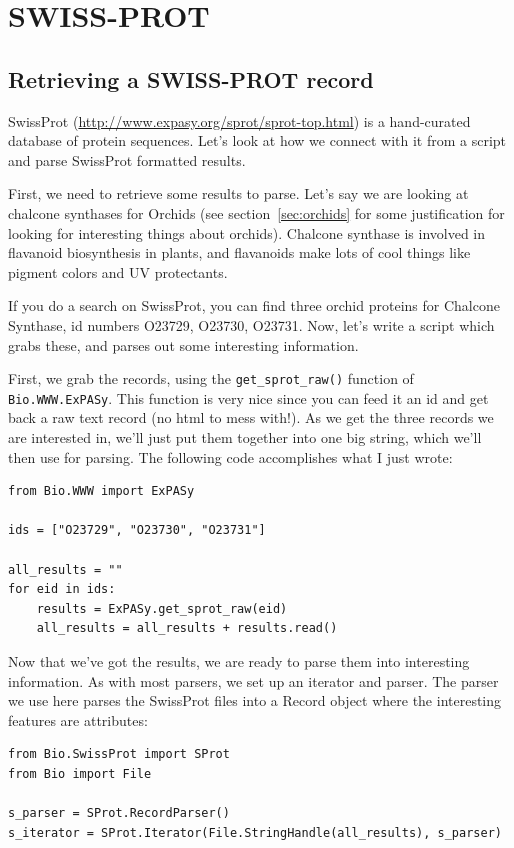 \documentclass{report}
\begin{document}
\section{SWISS-PROT}
\label{sec:swiss_prot}

\subsection{Retrieving a SWISS-PROT record}

SwissProt (\url{http://www.expasy.org/sprot/sprot-top.html}) is a hand-curated database of protein sequences. Let's look at how we connect with it from a script and parse SwissProt formatted results. 


First, we need to retrieve some results to parse. Let's say we are looking at chalcone synthases for Orchids (see section~\ref{sec:orchids} for some justification for looking for interesting things about orchids). Chalcone synthase is involved in flavanoid biosynthesis in plants, and flavanoids make lots of cool things like pigment colors and UV protectants. 


If you do a search on SwissProt, you can find three orchid proteins for Chalcone Synthase, id numbers O23729, O23730, O23731. Now, let's write a script which grabs these, and parses out some interesting information.


First, we grab the records, using the \verb|get_sprot_raw()| function of \verb|Bio.WWW.ExPASy|. This function is very nice since you can feed it an id and get back a raw text record (no html to mess with!). As we get the three records we are interested in, we'll just put them together into one big string, which we'll then use for parsing. The following code accomplishes what I just wrote:

\begin{verbatim}
from Bio.WWW import ExPASy

ids = ["O23729", "O23730", "O23731"]

all_results = ""
for eid in ids:
    results = ExPASy.get_sprot_raw(eid)
    all_results = all_results + results.read()
\end{verbatim}

Now that we've got the results, we are ready to parse them into interesting information. As with most parsers, we set up an iterator and parser. The parser we use here parses the SwissProt files into a Record object where the interesting features are attributes:

\begin{verbatim}
from Bio.SwissProt import SProt
from Bio import File

s_parser = SProt.RecordParser()
s_iterator = SProt.Iterator(File.StringHandle(all_results), s_parser)
\end{verbatim}
\end{document}

